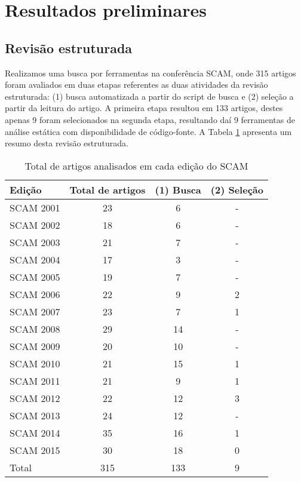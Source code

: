  \label{conclusoes}

\section{Resultados preliminares}

\subsection{Revisão estruturada}

Realizamos uma busca por ferramentas na conferência SCAM, onde 315 artigos
foram avaliados em duas etapas referentes as duas atividades da revisão
estruturada: (1) busca automatizada a partir do script de busca e (2) seleção
a partir da leitura do artigo. A primeira etapa resultou em 133 artigos,
destes apenas 9 foram selecionados na segunda etapa, resultando daí 9
ferramentas de análise estática com disponibilidade de código-fonte.
A Tabela \ref{artigos-do-scam} apresenta um resumo desta revisão estruturada.

\begin{table}[H]
\caption{Total de artigos analisados em cada edição do SCAM}
\centering
\begin{tabular}{| l | c | c | c |}
\hline
Edição    & Total de artigos & (1) Busca & (2) Seleção \\
\hline
SCAM 2001 & 23    & 6         & -           \\
SCAM 2002 & 18    & 6         & -           \\
SCAM 2003 & 21    & 7         & -           \\
SCAM 2004 & 17    & 3         & -           \\
SCAM 2005 & 19    & 7         & -           \\
SCAM 2006 & 22    & 9         & 2           \\
SCAM 2007 & 23    & 7         & 1           \\
SCAM 2008 & 29    & 14        & -           \\
SCAM 2009 & 20    & 10        & -           \\
SCAM 2010 & 21    & 15        & 1           \\
SCAM 2011 & 21    & 9         & 1           \\
SCAM 2012 & 22    & 12        & 3           \\
SCAM 2013 & 24    & 12        & -           \\
SCAM 2014 & 35    & 16        & 1           \\
SCAM 2015 & 30    & 18        & 0           \\
\hline
Total     & 315   & 133       & 9           \\
\hline
\end{tabular}
\label{artigos-do-scam}
\end{table}

